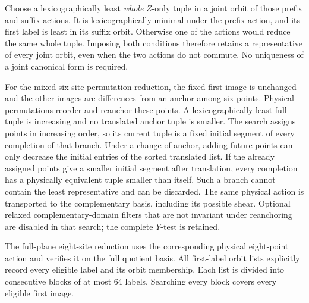 Choose a lexicographically least \emph{whole} \(Z\)-only tuple in a
joint orbit of those prefix and suffix actions. It is lexicographically minimal under the prefix action,
and its first label is least in its suffix orbit. Otherwise one of the
actions would reduce the same whole tuple. Imposing both conditions
therefore retains a representative of every joint orbit, even when the
two actions do not commute. No uniqueness of a joint canonical form
is required.

For the mixed six-site permutation reduction, the fixed first image is
unchanged and the other images are differences from an anchor among six
points. Physical permutations reorder and reanchor these points. A
lexicographically least full tuple is increasing and no translated
anchor tuple is smaller. The search assigns points in increasing order,
so its current tuple is a fixed initial segment of every completion of
that branch. Under a change of anchor, adding future points can only
decrease the initial entries of the sorted translated list. If the
already assigned points give a smaller initial segment after translation,
every completion has a physically equivalent tuple smaller
than itself. Such a branch cannot contain the least representative and
can be discarded.
The same physical action is transported to the complementary basis,
including its possible shear. Optional relaxed complementary-domain
filters that are not invariant under reanchoring are disabled in that
search; the complete \(Y\)-test is retained.

The full-plane eight-site reduction uses the corresponding physical
eight-point action and verifies it on the full quotient basis.
All first-label orbit lists explicitly record every eligible label and
its orbit membership. Each list is divided into consecutive blocks
of at most 64 labels. Searching every block covers every
eligible first image.
